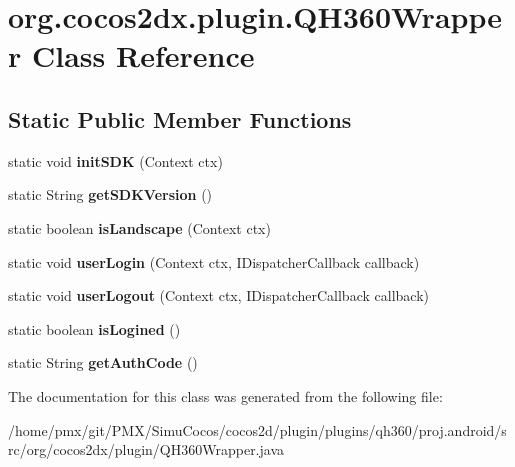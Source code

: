 \hypertarget{classorg_1_1cocos2dx_1_1plugin_1_1QH360Wrapper}{}\section{org.\+cocos2dx.\+plugin.\+Q\+H360\+Wrapper Class Reference}
\label{classorg_1_1cocos2dx_1_1plugin_1_1QH360Wrapper}
\subsection*{Static Public Member Functions}
\begin{DoxyCompactItemize}
\item 
\mbox{\label{classorg_1_1cocos2dx_1_1plugin_1_1QH360Wrapper_a5965e55f85500694bfbb418a7d4f7562}} 
static void {\bfseries init\+S\+DK} (Context ctx)
\item 
\mbox{\label{classorg_1_1cocos2dx_1_1plugin_1_1QH360Wrapper_ae62cc8f421b19b8120d28e43d9987f1e}} 
static String {\bfseries get\+S\+D\+K\+Version} ()
\item 
\mbox{\label{classorg_1_1cocos2dx_1_1plugin_1_1QH360Wrapper_a444793e3660695ed022d55280f716e5d}} 
static boolean {\bfseries is\+Landscape} (Context ctx)
\item 
\mbox{\label{classorg_1_1cocos2dx_1_1plugin_1_1QH360Wrapper_a06a4f1a6d617e8bdb52b00ba2abe03ca}} 
static void {\bfseries user\+Login} (Context ctx, I\+Dispatcher\+Callback callback)
\item 
\mbox{\label{classorg_1_1cocos2dx_1_1plugin_1_1QH360Wrapper_aeab3ccc5b175cdea33860ce84d4d82bc}} 
static void {\bfseries user\+Logout} (Context ctx, I\+Dispatcher\+Callback callback)
\item 
\mbox{\label{classorg_1_1cocos2dx_1_1plugin_1_1QH360Wrapper_a1d3d2696ab386049fcae081723e5d21f}} 
static boolean {\bfseries is\+Logined} ()
\item 
\mbox{\label{classorg_1_1cocos2dx_1_1plugin_1_1QH360Wrapper_a20e721657edebf37b704acc1d1ca3e64}} 
static String {\bfseries get\+Auth\+Code} ()
\end{DoxyCompactItemize}


The documentation for this class was generated from the following file\+:\begin{DoxyCompactItemize}
\item 
/home/pmx/git/\+P\+M\+X/\+Simu\+Cocos/cocos2d/plugin/plugins/qh360/proj.\+android/src/org/cocos2dx/plugin/Q\+H360\+Wrapper.\+java\end{DoxyCompactItemize}
